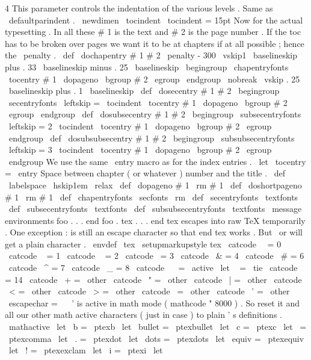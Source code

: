{{{{{{4
}
}
%
This
parameter
controls
the
indentation
of
the
various
levels
.
%
Same
as
\
defaultparindent
.
\
newdimen
\
tocindent
\
tocindent
=
15pt
%
Now
for
the
actual
typesetting
.
In
all
these
#
1
is
the
text
and
#
2
is
the
%
page
number
.
%
%
If
the
toc
has
to
be
broken
over
pages
we
want
it
to
be
at
chapters
%
if
at
all
possible
;
hence
the
\
penalty
.
\
def
\
dochapentry
#
1
#
2
{
%
\
penalty
-
300
\
vskip1
\
baselineskip
plus
.
33
\
baselineskip
minus
.
25
\
baselineskip
\
begingroup
\
chapentryfonts
\
tocentry
{
#
1
}
{
\
dopageno
\
bgroup
#
2
\
egroup
}
%
\
endgroup
\
nobreak
\
vskip
.
25
\
baselineskip
plus
.
1
\
baselineskip
}
\
def
\
dosecentry
#
1
#
2
{
\
begingroup
\
secentryfonts
\
leftskip
=
\
tocindent
\
tocentry
{
#
1
}
{
\
dopageno
\
bgroup
#
2
\
egroup
}
%
\
endgroup
}
\
def
\
dosubsecentry
#
1
#
2
{
\
begingroup
\
subsecentryfonts
\
leftskip
=
2
\
tocindent
\
tocentry
{
#
1
}
{
\
dopageno
\
bgroup
#
2
\
egroup
}
%
\
endgroup
}
\
def
\
dosubsubsecentry
#
1
#
2
{
\
begingroup
\
subsubsecentryfonts
\
leftskip
=
3
\
tocindent
\
tocentry
{
#
1
}
{
\
dopageno
\
bgroup
#
2
\
egroup
}
%
\
endgroup
}
%
We
use
the
same
\
entry
macro
as
for
the
index
entries
.
\
let
\
tocentry
=
\
entry
%
Space
between
chapter
(
or
whatever
)
number
and
the
title
.
\
def
\
labelspace
{
\
hskip1em
\
relax
}
\
def
\
dopageno
#
1
{
{
\
rm
#
1
}
}
\
def
\
doshortpageno
#
1
{
{
\
rm
#
1
}
}
\
def
\
chapentryfonts
{
\
secfonts
\
rm
}
\
def
\
secentryfonts
{
\
textfonts
}
\
def
\
subsecentryfonts
{
\
textfonts
}
\
def
\
subsubsecentryfonts
{
\
textfonts
}
\
message
{
environments
}
%
foo
.
.
.
end
foo
.
%
tex
.
.
.
end
tex
escapes
into
raw
TeX
temporarily
.
%
One
exception
:
is
still
an
escape
character
so
that
end
tex
works
.
%
But
\
or
will
get
a
plain
character
.
\
envdef
\
tex
{
%
\
setupmarkupstyle
{
tex
}
%
\
catcode
\
\
=
0
\
catcode
\
{
=
1
\
catcode
\
}
=
2
\
catcode
\
=
3
\
catcode
\
&
=
4
\
catcode
\
#
=
6
\
catcode
\
^
=
7
\
catcode
\
_
=
8
\
catcode
\
~
=
\
active
\
let
~
=
\
tie
\
catcode
\
%
=
14
\
catcode
\
+
=
\
other
\
catcode
\
"
=
\
other
\
catcode
\
|
=
\
other
\
catcode
\
<
=
\
other
\
catcode
\
>
=
\
other
\
catcode
\
=
\
other
\
catcode
\
'
=
\
other
\
escapechar
=
\
\
%
%
'
is
active
in
math
mode
(
mathcode
"
8000
)
.
So
reset
it
and
all
our
%
other
math
active
characters
(
just
in
case
)
to
plain
'
s
definitions
.
\
mathactive
%
\
let
\
b
=
\
ptexb
\
let
\
bullet
=
\
ptexbullet
\
let
\
c
=
\
ptexc
\
let
\
=
\
ptexcomma
\
let
\
.
=
\
ptexdot
\
let
\
dots
=
\
ptexdots
\
let
\
equiv
=
\
ptexequiv
\
let
\
!
=
\
ptexexclam
\
let
\
i
=
\
ptexi
\
let
\
}}}}}
